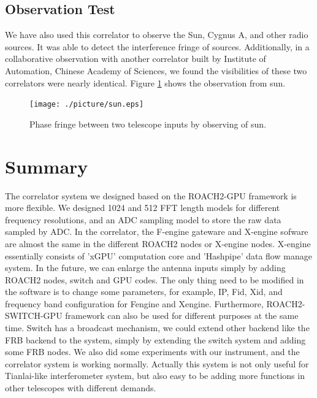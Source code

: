 \documentclass{ws-jai}
\begin{document}
\subsection{Observation Test}
We have also used this correlator to observe the Sun, Cygnus A, and other radio sources. It was able to detect the interference fringe of sources. Additionally, in a collaborative observation with another correlator built by Institute of Automation, Chinese Academy of Sciences, we found the visibilities of these two correlators  were nearly identical. Figure \ref{fig:sun} shows the observation from sun.
\begin{figure}[t]
 \centering
 \texttt{[image: ./picture/sun.eps]}
\caption{Phase fringe between two telescope inputs by observing of sun.\label{fig:sun}}
\end{figure}


\section{Summary}\label{sec:summary}	
The correlator system we designed based on the ROACH2-GPU framework is more flexible. We designed 1024 and 512 FFT length models for different frequency resolutions, and an ADC sampling model to store the raw data sampled by ADC. In the correlator, the F-engine gateware and X-engine sofware are almost the same in the different ROACH2 nodes or X-engine nodes. X-engine  essentially consists of 'xGPU' computation core and 'Hashpipe' data flow manage system.  In the future, we can enlarge the antenna inputs simply by adding ROACH2 nodes, switch and GPU codes.  The only thing need to be modified in the software is  to change some parameters, for example, IP, Fid, Xid, and frequency band configuration for Fengine and Xengine. Furthermore,  ROACH2-SWITCH-GPU framework can also be used for different purposes at the same time.   Switch has a broadcast mechanism,  we  could extend other backend like the FRB backend to the system, simply by extending the switch system and adding some FRB nodes.  
We also did some experiments with our instrument, and the correlator system is working normally.  Actually this system is not only useful for Tianlai-like interferometer system, but also easy to be adding more functions in other telescopes with different demands. 




\end{document}
